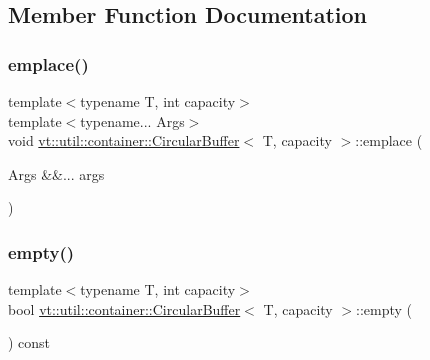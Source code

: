 \subsection{Member Function Documentation}
\mbox{\label{structvt_1_1util_1_1container_1_1_circular_buffer_a31bb27eb15a398ba25fbadf4aa0f2b58}} 
\subsubsection{\texorpdfstring{emplace()}{emplace()}}
{\footnotesize\ttfamily template$<$typename T, int capacity$>$ \\
template$<$typename... Args$>$ \\
void \hyperlink{structvt_1_1util_1_1container_1_1_circular_buffer}{vt\+::util\+::container\+::\+Circular\+Buffer}$<$ T, capacity $>$\+::emplace (\begin{DoxyParamCaption}\item[{Args \&\&...}]{args }\end{DoxyParamCaption})\hspace{0.3cm}{\ttfamily [inline]}}

\mbox{\label{structvt_1_1util_1_1container_1_1_circular_buffer_a856c48e3984ef0d66d595d303fc5ff99}} 
\subsubsection{\texorpdfstring{empty()}{empty()}}
{\footnotesize\ttfamily template$<$typename T, int capacity$>$ \\
bool \hyperlink{structvt_1_1util_1_1container_1_1_circular_buffer}{vt\+::util\+::container\+::\+Circular\+Buffer}$<$ T, capacity $>$\+::empty (\begin{DoxyParamCaption}{ }\end{DoxyParamCaption}) const\hspace{0.3cm}{\ttfamily [inline]}}

